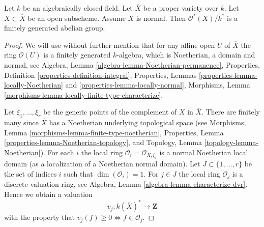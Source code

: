 \begin{lemma}
\label{lemma-open-in-normal-proper}
Let $k$ be an algebraically closed field.
Let $\overline{X}$ be a proper variety over $k$.
Let $X \subset \overline{X}$ be an open subscheme.
Assume $X$ is normal.
Then $\mathcal{O}^*(X)/k^*$ is a finitely generated abelian group.
\end{lemma}

\begin{proof}
We will use without further mention that for any affine open $U$ of
$\overline{X}$ the ring $\mathcal{O}(U)$ is a finitely generated
$k$-algebra, which is Noetherian, a domain and normal, see
Algebra, Lemma \ref{algebra-lemma-Noetherian-permanence},
Properties, Definition \ref{properties-definition-integral},
Properties, Lemmas \ref{properties-lemma-locally-Noetherian} and
\ref{properties-lemma-locally-normal},
Morphisms, Lemma \ref{morphisms-lemma-locally-finite-type-characterize}.

\medskip\noindent
Let $\xi_1, \ldots, \xi_r$ be the generic points of the complement of $X$
in $\overline{X}$. There are finitely many since $\overline{X}$ has a
Noetherian underlying topological space (see
Morphisms, Lemma \ref{morphisms-lemma-finite-type-noetherian},
Properties, Lemma \ref{properties-lemma-Noetherian-topology}, and
Topology, Lemma \ref{topology-lemma-Noetherian}).
For each $i$ the local ring $\mathcal{O}_i = \mathcal{O}_{X, \xi_i}$
is a normal Noetherian local domain (as a localization of a
Noetherian normal domain). Let $J \subset \{1, \ldots, r\}$ be the set of
indices $i$ such that $\dim(\mathcal{O}_i) = 1$. For $j \in J$ the
local ring $\mathcal{O}_j$ is a discrete valuation ring, see
Algebra, Lemma \ref{algebra-lemma-characterize-dvr}.
Hence we obtain a valuation
$$
v_j : k(\overline{X})^* \longrightarrow \mathbf{Z}
$$
with the property that $v_j(f) \geq 0 \Leftrightarrow f \in \mathcal{O}_j$.


\end{proof}
